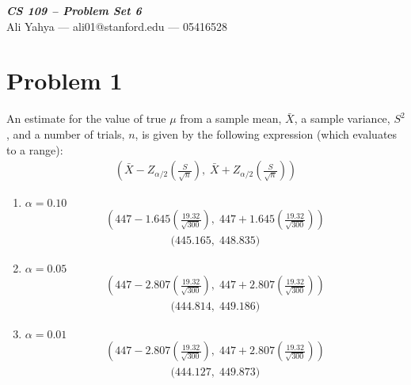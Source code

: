\documentclass[12pt]{article}
\begin{document}

   \begin{center}
      {\textbf{
         {\textit{
            {\Large{CS 109 -- Problem Set 6}}
         }}
      }}\\[2pt]
      {\large{Ali Yahya --- ali01@stanford.edu --- 05416528}}
   \end{center}


   \section*{Problem 1}
      An estimate for the value of true $\mu$ from a sample mean, $\bar{X}$,
      a sample variance, $S^2$, and a number of trials, $n$, is given by the
      following expression (which evaluates to a range):
      \begin{align*}
         \left(
            \bar{X} - Z_{\alpha / 2} \left(\frac{S}{\sqrt{n}}\right),\;
            \bar{X} + Z_{\alpha / 2} \left(\frac{S}{\sqrt{n}}\right)
         \right)
      \end{align*}
      \begin{enumerate}
         \item $\alpha = 0.10$
            \begin{align*}
               \left(
                  447 - 1.645 \left(\frac{19.32}{\sqrt{300}}\right),\;
                  447 + 1.645 \left(\frac{19.32}{\sqrt{300}}\right)
               \right)
            \end{align*}
            \begin{align*}
               \boxed{\Big(445.165,\; 448.835\Big)}
            \end{align*}
         \item
            $\alpha = 0.05$
            \begin{align*}
               \left(
                  447 - 2.807 \left(\frac{19.32}{\sqrt{300}}\right),\;
                  447 + 2.807 \left(\frac{19.32}{\sqrt{300}}\right)
               \right)
            \end{align*}
            \begin{align*}
               \boxed{\Big(444.814,\; 449.186\Big)}
            \end{align*}
         \item
            $\alpha = 0.01$
            \begin{align*}
               \left(
                  447 - 2.807 \left(\frac{19.32}{\sqrt{300}}\right),\;
                  447 + 2.807 \left(\frac{19.32}{\sqrt{300}}\right)
               \right)
            \end{align*}
            \begin{align*}
               \boxed{\Big(444.127,\; 449.873\Big)}
            \end{align*}
      \end{enumerate}
\end{document}
